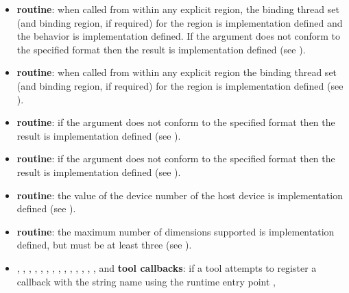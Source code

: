 \begin{itemize}
\item {} \textbf{routine}: when called from within 
      any explicit  region, the binding thread set (and binding 
      region, if required) for the  region is 
      implementation defined and the behavior is implementation defined. If 
      the argument does not conform to the specified format then the result 
      is implementation defined (see ).
\item {} \textbf{routine}: when called from within 
      any explicit  region the binding thread set (and binding 
      region, if required) for the  region is 
      implementation defined (see ).
\item {} \textbf{routine}:  if the argument does not
      conform to the specified format then the result is implementation defined 
      (see ).
\item {} \textbf{routine}:  if the  argument 
      does not conform to the specified format then the result is implementation 
      defined (see ).
\item {} \textbf{routine}: the value of the device 
      number of the host device is implementation defined (see 
      ).
\item {} \textbf{routine}: the maximum number of 
      dimensions supported is implementation defined, but must be at least 
      three (see ).
\item {}, ,
      , ,
      , ,
      , ,
      , ,
      , ,
      , ,
       and 
      \textbf{tool callbacks}: if a tool attempts to register a callback 
      with the string name using the runtime entry point , 

\end{itemize}

